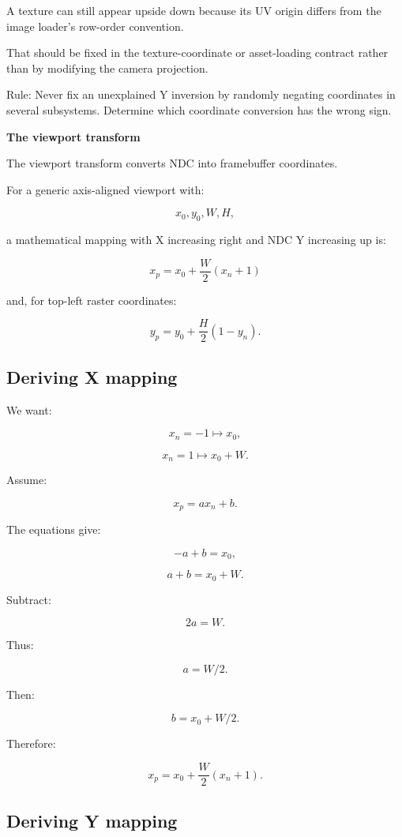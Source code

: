 A texture can still appear upside down because its UV origin differs from the image loader's row-order convention.

That should be fixed in the texture-coordinate or asset-loading contract rather than by modifying the camera projection.

Rule: Never fix an unexplained Y inversion by randomly negating coordinates in several subsystems. Determine which coordinate conversion has the wrong sign.

\textbf{The viewport transform}

The viewport transform converts NDC into framebuffer coordinates.

For a generic axis-aligned viewport with:

\[
 x_0,y_0,W,H,
\]

a mathematical mapping with X increasing right and NDC Y increasing up is:

\[
 \boxed{ x_p=x_0+\frac W2(x_n+1) }
\]

and, for top-left raster coordinates:

\[
 \boxed{ y_p=y_0+\frac H2(1-y_n) }.
\]

\subsection{Deriving X mapping}\label{02-foundations-ii-ch033-deriving-x-mapping}

\hypertarget{02-foundations-ii-ch033-deriving-x-mapping}{}

We want:

\[
 x_n=-1\mapsto x_0,
\]

\[
 x_n=1\mapsto x_0+W.
\]

Assume:

\[
 x_p=ax_n+b.
\]

The equations give:

\[
 -a+b=x_0,
\]

\[
 a+b=x_0+W.
\]

Subtract:

\[
 2a=W.
\]

Thus:

\[
 a=W/2.
\]

Then:

\[
 b=x_0+W/2.
\]

Therefore:

\[
 \boxed{ x_p=x_0+\frac W2(x_n+1) }.
\]

\subsection{Deriving Y mapping}\label{02-foundations-ii-ch033-deriving-y-mapping}

